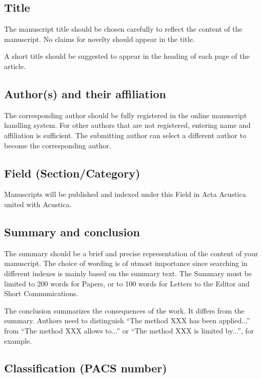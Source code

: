 \documentclass[twocolumn]{article}
\begin{document}
\subsection{Title}

The manuscript title should be chosen carefully to reflect the content
of the manuscript. No claims for novelty should appear in the title.

A short title should be suggested to appear in the heading of each page
of the article.

\subsection{Author(s) and their affiliation}

The corresponding author should be fully registered in the online
manuscript handling system. For other authors that are not registered,
entering name and affiliation is sufficient. The submitting author can
select a different author to become the corresponding author.

\subsection{Field (Section/Category)}

Manuscripts will be published and indexed under this Field in Acta
Acustica united with Acustica.

\subsection{Summary and conclusion}

The summary should be a brief and precise representation of the content
of your manuscript. The choice of wording is of utmost importance since
searching in different indexes is mainly based on the summary text. The
Summary must be limited to 200 words for Papers, or to 100 words for
Letters to the Editor and Short Communications.

The conclusion summarizes the consequences of the work. It differs from
the summary. Authors need to distinguish ``The method XXX has been
applied...'' from ``The method XXX allows to...'' or ``The method XXX is
limited by...'', for example.

\subsection{Classification (PACS number)}
\end{document}
